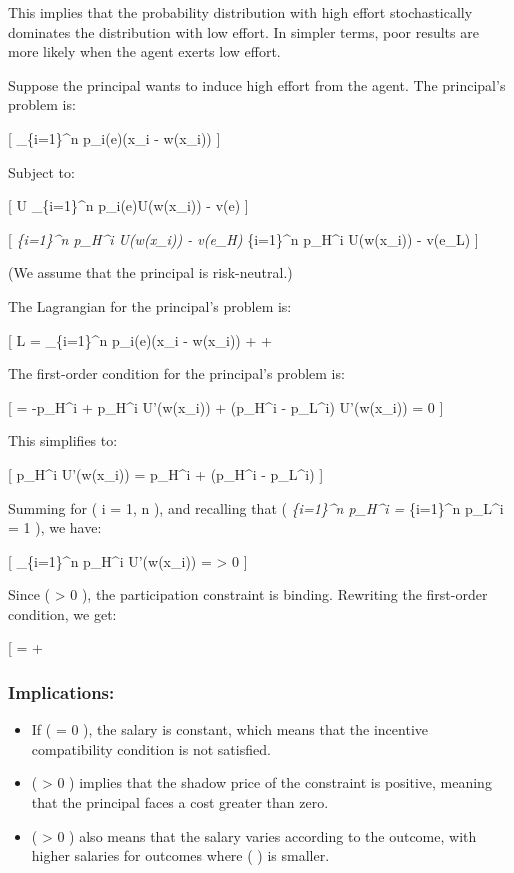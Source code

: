 \documentclass[
  letterpaper,
  DIV=11,
  numbers=noendperiod]{scrartcl}
\providecommand{\tightlist}{%
  \setlength{\itemsep}{0pt}\setlength{\parskip}{0pt}}\usepackage{longtable,booktabs,array}
\begin{document}
This implies that the probability distribution with high effort
stochastically dominates the distribution with low effort. In simpler
terms, poor results are more likely when the agent exerts low effort.

Suppose the principal wants to induce high effort from the agent. The
principal's problem is:

{[} \max \sum\_\{i=1\}\^{}n p\_i(e)(x\_i - w(x\_i)) {]}

Subject to:

{[} U \leq \sum\_\{i=1\}\^{}n p\_i(e)U(w(x\_i)) - v(e) {]}

{[} \sum\emph{\{i=1\}\^{}n p\_H\^{}i U(w(x\_i)) - v(e\_H)
\geq \sum}\{i=1\}\^{}n p\_H\^{}i U(w(x\_i)) - v(e\_L) {]}

(We assume that the principal is risk-neutral.)

The Lagrangian for the principal's problem is:

{[} L = \sum\_\{i=1\}\^{}n p\_i(e)(x\_i - w(x\_i)) +
\lambda \left[\sum_{i=1}^n p_H^i U(w(x_i)) - v(e_H) - U \right] +
\mu \left[ \sum_{i=1}^n (p_H^i - p_L^i) U(w(x_i)) - v(e_H) + v(e_L) \right]{]}

The first-order condition for the principal's problem is:

{[}  = -p\_H\^{}i + \lambda p\_H\^{}i
U'(w(x\_i)) + \mu (p\_H\^{}i - p\_L\^{}i) U'(w(x\_i)) = 0 {]}

This simplifies to:

{[} p\_H\^{}i U'(w(x\_i)) = \lambda p\_H\^{}i + \mu (p\_H\^{}i -
p\_L\^{}i) {]}

Summing for ( i = 1, n ), and recalling that ( \sum\emph{\{i=1\}\^{}n
p\_H\^{}i = \sum}\{i=1\}\^{}n p\_L\^{}i = 1 ), we have:

{[} \sum\_\{i=1\}\^{}n p\_H\^{}i U'(w(x\_i)) = \lambda \textgreater{} 0
{]}

Since ( \lambda \textgreater{} 0 ), the participation constraint is
binding. Rewriting the first-order condition, we get:

{[}  = \lambda +
\mu \left[ 1 - \frac{p_L^i}{p_H^i} \right]{]}

\subsubsection{Implications:}\label{implications}

\begin{itemize}
\tightlist
\item
  If ( \mu = 0 ), the salary is constant, which means that the incentive
  compatibility condition is not satisfied.
\item
  ( \mu \textgreater{} 0 ) implies that the shadow price of the
  constraint is positive, meaning that the principal faces a cost
  greater than zero.
\item
  ( \mu \textgreater{} 0 ) also means that the salary varies according
  to the outcome, with higher salaries for outcomes where (
   ) is smaller.
\end{itemize}
\end{document}
